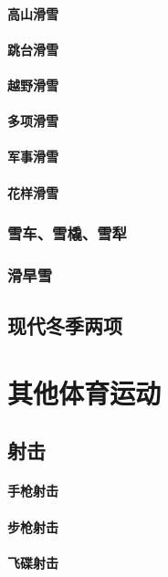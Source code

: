 \documentclass[UTF8]{../../ApplicationUniverse}
\begin{document}
        \subsubsection{高山滑雪}
        \subsubsection{跳台滑雪}
        \subsubsection{越野滑雪}
        \subsubsection{多项滑雪}
        \subsubsection{军事滑雪}
        \subsubsection{花样滑雪}
    \subsection{雪车、雪橇、雪犁}
    \subsection{滑旱雪}
\section{现代冬季两项}





\chapter{其他体育运动}
\section{射击}
    \subsubsection{手枪射击}
    \subsubsection{步枪射击}
    \subsubsection{飞碟射击}
\end{document}
